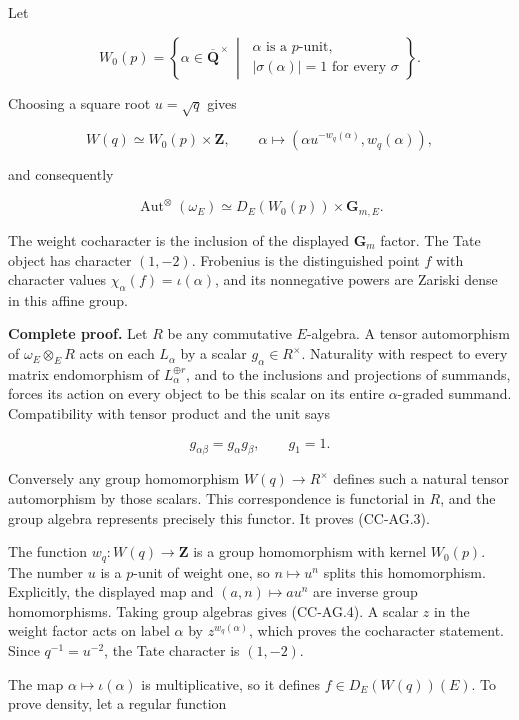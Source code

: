 Let

\[
 W_0(p)=\left\{\alpha\in\overline{\mathbf Q}^{\,\times}\ \middle|\
 \begin{array}{l}
 \alpha\text{ is a }p\text{-unit},\\
 |\sigma(\alpha)|=1\text{ for every }\sigma
 \end{array}\right\}.
\]

Choosing a square root \(u=\sqrt q\) gives

\[
 W(q)\simeq W_0(p)\times\mathbf Z,\qquad
 \alpha\longmapsto(\alpha u^{-w_q(\alpha)},w_q(\alpha)),
\]

and consequently

\[
 \operatorname{Aut}^{\otimes}(\omega_E)
       \simeq D_E(W_0(p))\times\mathbf G_{m,E}.       \tag{CC-AG.4}
\]

The weight cocharacter is the inclusion of the displayed \(\mathbf G_m\)
factor. The Tate object has character \((1,-2)\). Frobenius is the
distinguished point \(f\) with character values
\(\chi_\alpha(f)=\iota(\alpha)\), and its nonnegative powers are Zariski
dense in this affine group.

\textbf{Complete proof.} Let \(R\) be any commutative \(E\)-algebra. A
tensor automorphism of \(\omega_E\otimes_E R\) acts on each \(L_\alpha\)
by a scalar \(g_\alpha\in R^\times\). Naturality with respect to every
matrix endomorphism of \(L_\alpha^{\oplus r}\), and to the inclusions
and projections of summands, forces its action on every object to be
this scalar on its entire \(\alpha\)-graded summand. Compatibility with
tensor product and the unit says

\[
 g_{\alpha\beta}=g_\alpha g_\beta,\qquad g_1=1.
\]

Conversely any group homomorphism \(W(q)\to R^\times\) defines such a
natural tensor automorphism by those scalars. This correspondence is
functorial in \(R\), and the group algebra represents precisely this
functor. It proves (CC-AG.3).

The function \(w_q:W(q)\to\mathbf Z\) is a group homomorphism with
kernel \(W_0(p)\). The number \(u\) is a \(p\)-unit of weight one, so
\(n\mapsto u^n\) splits this homomorphism. Explicitly, the displayed map
and \((a,n)\mapsto au^n\) are inverse group homomorphisms. Taking group
algebras gives (CC-AG.4). A scalar \(z\) in the weight factor acts on
label \(\alpha\) by \(z^{w_q(\alpha)}\), which proves the cocharacter
statement. Since \(q^{-1}=u^{-2}\), the Tate character is \((1,-2)\).

The map \(\alpha\mapsto\iota(\alpha)\) is multiplicative, so it defines
\(f\in D_E(W(q))(E)\). To prove density, let a regular function

